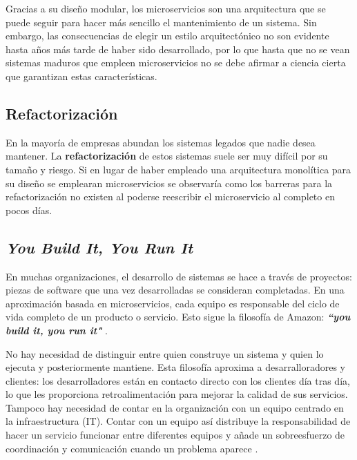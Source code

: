 \documentclass[11pt,spanish,listoffigures]{tfgetsinf}
\begin{document}
Gracias a su diseño modular, los microservicios son una arquitectura que se puede seguir para hacer más sencillo el mantenimiento de un sistema. Sin embargo, las consecuencias de elegir un estilo arquitectónico no son evidente hasta años más tarde de haber sido desarrollado, por lo que hasta que no se vean sistemas maduros que empleen microservicios no se debe afirmar a ciencia cierta que garantizan estas características. \cite{Lewis2014}

\subsection{Refactorización}


En la mayoría de empresas abundan los sistemas legados que nadie desea mantener. La \textbf{refactorización} de estos sistemas suele ser muy difícil por su tamaño y riesgo. Si en lugar de haber empleado una arquitectura monolítica para su diseño se emplearan microservicios se observaría como los barreras para la refactorización no existen al poderse reescribir el microservicio al completo en pocos días. \cite{Eaves2014}

\subsection{\textit{You Build It, You Run It}}

En muchas organizaciones, el desarrollo de sistemas se hace a través de proyectos: piezas de software que una vez desarrolladas se consideran completadas. En una aproximación basada en microservicios, cada equipo es responsable del ciclo de vida completo de un producto o servicio. Esto sigue la filosofía de Amazon: \textbf{\textit{``you build it, you run it"}} \cite{Lewis2014}.

No hay necesidad de distinguir entre quien construye un sistema y quien lo ejecuta y posteriormente mantiene. Esta filosofía aproxima a desarralloradores y clientes: los desarrolladores están en contacto directo con los clientes día tras día, lo que les proporciona retroalimentación para mejorar la calidad de sus servicios. Tampoco hay necesidad de contar en la organización con un equipo centrado en la infraestructura (IT). Contar con un equipo así distribuye la responsabilidad de hacer un servicio funcionar entre diferentes equipos y añade un sobreesfuerzo de coordinación y comunicación cuando un problema aparece \cite{Vliet2011}.
\end{document}
